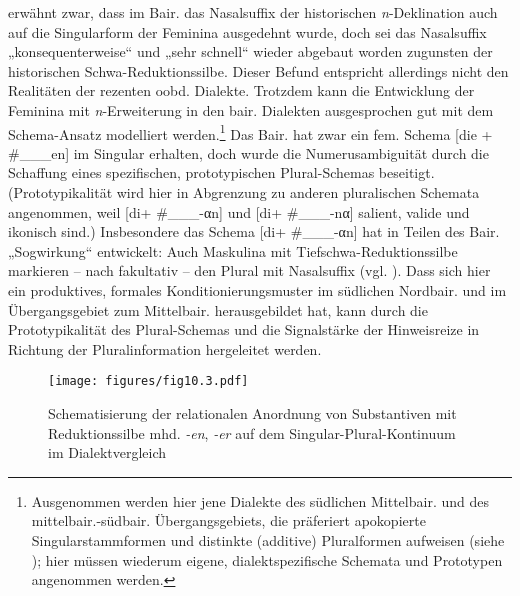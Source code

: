 \citet[120]{Köpcke1993} erwähnt zwar, dass im Bair. das Nasalsuffix der historischen \textit{n}{}-Deklination auch auf die Singularform der Feminina ausgedehnt wurde, doch sei das Nasalsuffix „konsequenterweise“ und „sehr schnell“ wieder abgebaut worden zugunsten der historischen Schwa-Reduktionssilbe. Dieser Befund entspricht allerdings nicht den Realitäten der rezenten oobd. Dialekte. Trotzdem kann die Entwicklung der Feminina mit \textit{n}{}-Erweiterung in den bair. Dialekten ausgesprochen gut mit dem Schema-Ansatz modelliert werden.\footnote{Ausgenommen werden hier jene Dialekte des südlichen Mittelbair. und des mittelbair.-südbair. Übergangsgebiets, die präferiert apokopierte Singularstammformen und distinkte (additive) Pluralformen aufweisen (siehe ); hier müssen wiederum eigene, dialektspezifische Schemata und Prototypen angenommen werden.} Das Bair. hat zwar ein fem. Schema [die + \#\_\_\_en] im Singular erhalten, doch wurde die Numerusambiguität durch die Schaffung eines spezifischen, prototypischen Plural-Schemas beseitigt. (Prototypikalität wird hier in Abgrenzung zu anderen pluralischen Schemata angenommen, weil [di+ \#\_\_\_-αn] und [di+ \#\_\_\_-nα] salient, valide und ikonisch sind.) Insbesondere das Schema [di+ \#\_\_\_-αn] hat in Teilen des Bair. „Sogwirkung“ \citep[103]{Köpcke1993} entwickelt: Auch Maskulina mit Tiefschwa-Reduktionssilbe markieren -- nach \citet[153]{Rowley1997} fakultativ -- den Plural mit Nasalsuffix (vgl. ). Dass sich hier ein produktives, formales Konditionierungsmuster im südlichen Nordbair. und im Übergangsgebiet zum Mittelbair. herausgebildet hat, kann durch die Prototypikalität des Plural-Schemas und die Signalstärke der Hinweisreize in Richtung der Pluralinformation hergeleitet werden.


\begin{figure}
\texttt{[image: figures/fig10.3.pdf]}
\caption{\label{fig:10.3} Schematisierung der relationalen Anordnung von Substantiven mit Reduktionssilbe mhd. \textit{-en}, \textit{-er} auf dem Singular-Plural-Kontinuum im Dialektvergleich}
\end{figure}

